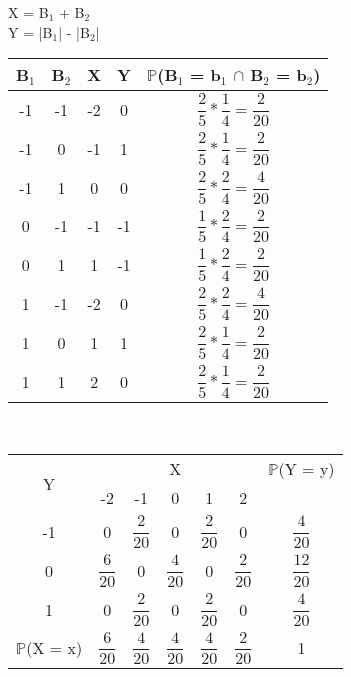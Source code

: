 \documentclass[12pt,a4paper]{article}
\begin{document}
	\begin{center}
		X = B$_{1}$ + B$_{2}$
		\vspace{0.25cm}\\
		Y = |B$_{1}$| - |B$_{2}$|
		\vspace{1cm}\\
		\begin{tabular}{ccccc}
			B$_{1}$ & B$_{2}$ & X & Y & $\mathbb{P}$(B$_{1}$ = b$_{1}$ $\cap$ B$_{2}$ = b$_{2}$)\\ \midrule
			-1 & -1 & -2 & 0 & $\dfrac{2}{5} * \dfrac{1}{4} = \dfrac{2}{20}$\\ \midrule
			-1 & 0 & -1 & 1 & $\dfrac{2}{5} * \dfrac{1}{4} = \dfrac{2}{20}$\\ \midrule
			-1 & 1 & 0 & 0 & $\dfrac{2}{5} * \dfrac{2}{4} = \dfrac{4}{20}$\\ \midrule
			0 & -1 & -1 & -1& $\dfrac{1}{5} * \dfrac{2}{4} = \dfrac{2}{20}$\\ \midrule 
			0 & 1 & 1 & -1 & $\dfrac{1}{5} * \dfrac{2}{4} = \dfrac{2}{20}$\\ \midrule 
			1 & -1 & -2 & 0 & $\dfrac{2}{5} * \dfrac{2}{4} = \dfrac{4}{20}$\\ \midrule
			1 & 0 & 1 & 1 & $\dfrac{2}{5} * \dfrac{1}{4} = \dfrac{2}{20}$\\ \midrule
			1 & 1 & 2 & 0 & $\dfrac{2}{5} * \dfrac{1}{4} = \dfrac{2}{20}$\\ \midrule
		\end{tabular}
		\vspace{1cm}\\
		\begin{tabular}{ccccccc}
			\multirow{2}{*}{Y} & \multicolumn{5}{c}{X} & $\mathbb{P}$(Y = y)\\ \cmidrule{2-6}
			& -2 & -1 & 0 & 1 & 2 &\\ \midrule
			-1 & 0 & $\dfrac{2}{20}$ & 0 & $\dfrac{2}{20}$ & 0 & $\dfrac{4}{20}$\\ \midrule
			0 & $\dfrac{6}{20}$ & 0 & $\dfrac{4}{20}$ & 0 & $\dfrac{2}{20}$ & $\dfrac{12}{20}$\\ \midrule
			1 & 0 & $\dfrac{2}{20}$ & 0 & $\dfrac{2}{20}$ & 0 & $\dfrac{4}{20}$\\ \midrule
			$\mathbb{P}$(X = x) & $\dfrac{6}{20}$ & $\dfrac{4}{20}$ & $\dfrac{4}{20}$ & $\dfrac{4}{20}$ & $\dfrac{2}{20}$ & 1\\
		\end{tabular}
		\vspace{1cm}\\
		\begin{tabular}{cc}

\end{tabular}
\end{center}
\end{document}
